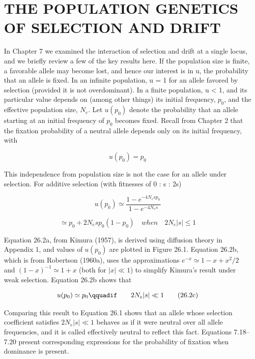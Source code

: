 \documentclass{article}
\begin{document}
\section{THE POPULATION GENETICS OF SELECTION AND DRIFT}
In Chapter 7 we examined the interaction of selection and drift at a single locus, and we briefly review a few of the key results here. If the population size is finite, a favorable allele may become lost, and hence our interest is in u, the probability that an allele is fixed. In an infinite population, u = 1 for an allele favored by selection (provided it is not overdominant). In a finite population, u < 1, and its particular value depends on (among other things) its initial frequency,  $ p_0 $, and the effective population size,  $ N_e $. Let  $ u(p_0) $ denote the probability that an allele starting at an initial frequency of  $ p_0 $ becomes fixed. Recall from Chapter 2 that the fixation probability of a neutral allele depends only on its initial frequency, with

\begin{equation}
u(p_{0})=p_{0}
\tag{26.1}
\label{eq:26_1}
\end{equation}

This independence from population size is not the case for an allele under selection. For additive selection (with fitnesses of 0 : s : 2s)

\begin{equation}
u(p_{0})\simeq\frac{1-e^{-4N_{e}sp_{0}}}{1-e^{-4N_{e}s}}
\tag{26.2a}
\label{eq:26_2a}
\end{equation}

\begin{equation}
\simeq p_{0}+2N_{e}sp_{0}(1-p_{0})\quad when\quad2N_{e}|s|\leq1
\tag{26.2b}
\label{eq:26_2b}
\end{equation}

Equation 26.2a, from Kimura (1957), is derived using diffusion theory in Appendix 1, and values of  $ u(p_0) $ are plotted in Figure 26.1. Equation 26.2b, which is from Robertson (1960a), uses the approximations  $ e^{-x} \simeq 1 - x + x^2/2 $ and  $ (1 - x)^{-1} \simeq 1 + x $ (both for  $ |x| \ll 1 $) to simplify Kimura's result under weak selection. Equation 26.2b shows that

\begin{equation}
u(p_{0})\simeq p_{0}\qquadif\qquad2N_{e}|s|\ll1
\tag{26.2c}
\label{eq:26_2c}
\end{equation}

Comparing this result to Equation 26.1 shows that an allele whose selection coefficient satisfies  $ 2N_e | s| \ll 1 $ behaves as if it were neutral over all allele frequencies, and it is called effectively neutral to reflect this fact. Equations 7.18–7.20 present corresponding expressions for the probability of fixation when dominance is present.
\end{document}
